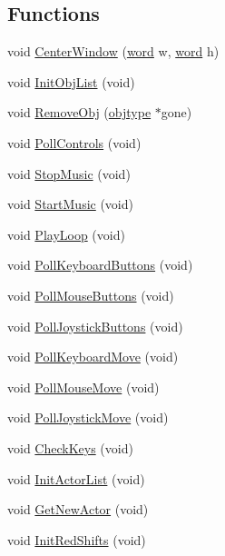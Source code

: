 \subsection*{Functions}
\begin{DoxyCompactItemize}
\item 
void \hyperlink{WL__PLAY_8C_a673946129c833c78df674cf8b38fdd61}{CenterWindow} (\hyperlink{ID__HEAD_8H_abad51e07ab6d26bec9f1f786c8d65bcd}{word} w, \hyperlink{ID__HEAD_8H_abad51e07ab6d26bec9f1f786c8d65bcd}{word} h)
\item 
void \hyperlink{WL__PLAY_8C_a7e299f71964777aaec29a227f3787a08}{InitObjList} (void)
\item 
void \hyperlink{WL__PLAY_8C_a2cf5a059e3bf9f094eb8427afbd49664}{RemoveObj} (\hyperlink{structobjstruct}{objtype} $\ast$gone)
\item 
void \hyperlink{WL__PLAY_8C_a15ba9210e22ebca4139dd64d5ede0d05}{PollControls} (void)
\item 
void \hyperlink{WL__PLAY_8C_a4f0b9aceb236c59d54712be5ace9e96e}{StopMusic} (void)
\item 
void \hyperlink{WL__PLAY_8C_a3374c0ac5e4769e46cebf74f4180dca4}{StartMusic} (void)
\item 
void \hyperlink{WL__PLAY_8C_a1093a19e7a1263f20a026e662db7121f}{PlayLoop} (void)
\item 
void \hyperlink{WL__PLAY_8C_a22fdcf55958dec2af2a4cadf2527132b}{PollKeyboardButtons} (void)
\item 
void \hyperlink{WL__PLAY_8C_ab275bee53ffe48bfc6c7872c69bd2005}{PollMouseButtons} (void)
\item 
void \hyperlink{WL__PLAY_8C_aa7748b3251e7e3ada1602178da175b5a}{PollJoystickButtons} (void)
\item 
void \hyperlink{WL__PLAY_8C_a2421aa5bd193c7bde69471bb17874e18}{PollKeyboardMove} (void)
\item 
void \hyperlink{WL__PLAY_8C_a9a5a5d7e7fb47d410c066dc8f62b62b0}{PollMouseMove} (void)
\item 
void \hyperlink{WL__PLAY_8C_a81edd19fd047b993a9e690f9414b3eff}{PollJoystickMove} (void)
\item 
void \hyperlink{WL__PLAY_8C_a17d3d73686c9990962f3957447344f0b}{CheckKeys} (void)
\item 
void \hyperlink{WL__PLAY_8C_a8d7a0f55f08fed814aee83d9376482cd}{InitActorList} (void)
\item 
void \hyperlink{WL__PLAY_8C_abf7aec13a61bd972c2756f07143abf80}{GetNewActor} (void)
\item 
void \hyperlink{WL__PLAY_8C_ae062cb46486d374e2bbd2a68c3fd6a96}{InitRedShifts} (void)

\end{DoxyCompactItemize}

